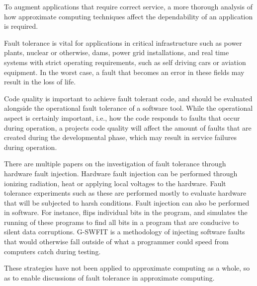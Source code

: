 To augment applications that require correct service, a more thorough analysis of how approximate computing techniques affect the dependability of an application is required.

Fault tolerance is vital for applications in critical infrastructure such as power plants, nuclear or otherwise, dams, power grid installations, and real time systems with strict operating requirements, such as self driving cars or aviation equipment. In the worst case, a fault that becomes an error in these fields may result in the loss of life. 

Code quality is important to achieve fault tolerant code, and should be evaluated alongside the operational fault tolerance of a software tool. While the operational aspect is certainly important, i.e., how the code responds to faults that occur during operation, a projects code quality will affect the amount of faults that are created during the developmental phase, which may result in service failures during operation. 

There are multiple papers on the investigation of fault tolerance through hardware fault injection. Hardware fault injection can be performed through ionizing radiation, heat or applying local voltages to the hardware. Fault tolerance experiments such as these are performed mostly to evaluate hardware that will be subjected to harsh conditions. 
Fault injection can also be performed in software. For instance,  flips individual bits in the program, and simulates the running of these programs to find all bits in a program that are conducive to silent data corruptions.  G-SWFIT is a methodology of injecting software faults that would otherwise fall outside of what a programmer could speed from computers catch during testing. 

These strategies have not been applied to approximate computing as a whole, so as to enable discussions of fault tolerance in approximate computing.

